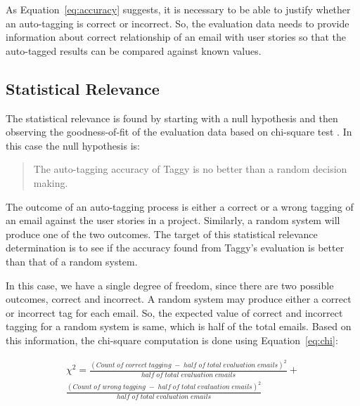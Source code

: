 As Equation~\ref{eq:accuracy} suggests, it is necessary to be able to justify whether an auto-tagging is correct or incorrect. So, the evaluation data needs to provide information about correct relationship of an email with user stories so that the auto-tagged results can be compared against  known values.

\subsection{Statistical Relevance}
The statistical relevance is found by starting with a null hypothesis and then observing the goodness-of-fit of the evaluation data based on chi-square test \cite{chi_square}. In this case the null hypothesis is:

\begin{quote}
	The auto-tagging accuracy of Taggy is no better than a random decision making.
\end{quote}

The outcome of an auto-tagging process is either a correct or a wrong tagging of an email against the user stories in a project. Similarly, a random system will produce one of the two outcomes. The target of this statistical relevance determination is to see if the accuracy found from Taggy's evaluation is better than that of a random system.

In this case, we have a single degree of freedom, since there are two possible outcomes, correct and incorrect. A random system may produce either a correct or incorrect tag for each email. So, the expected value of correct and incorrect tagging for a random system is same, which is half of the total emails. Based on this information, the chi-square computation is done using Equation~\ref{eq:chi}:

\begin{equation}
\label{eq:chi}
\begin{split}
	\chi ^ 2 = \frac {(Count \; of \; correct \; tagging \; - \; half \; of \; total \; evaluation \; emails) ^ 2} {half \;  of \;  total \;  evaluation \;  emails} +  	
\\
	\frac{(Count \; of \; wrong \; tagging \; - \; half \; of \; total \; evaluation \; emails)  ^ 2} {half \; of \; total \; evaluation \; emails}
\end{split}	
\end{equation}                                       

